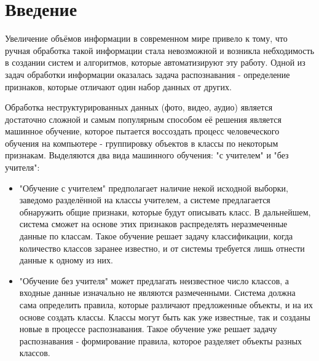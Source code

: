\documentclass[12pt,a4paper]{article}
\begin{document}
\section{Введение}
Увеличение объёмов информации в современном мире привело к тому, что ручная обработка такой информации стала невозможной и возникла небходимость в создании систем и алгоритмов, которые автоматизируют эту работу. Одной из задач обработки информации оказалась задача распознавания - определение признаков, которые отличают один набор данных от других.

Обработка неструктурированных данных (фото, видео, аудио) является достаточно сложной и самым популярным способом её решения является машинное обучение, которое пытается воссоздать процесс человеческого обучения на компьютере - группировку объектов в классы по некоторым признакам. Выделяются два вида машинного обучения: "с учителем" и "без учителя":
\begin{itemize}
    \item "Обучение с учителем" предполагает наличие некой исходной выборки, заведомо разделённой на классы учителем, а системе предлагается обнаружить общие признаки, которые будут описывать класс. В дальнейшем, система сможет на основе этих признаков распределять неразмеченные данные по классам. Такое обучение решает задачу классификации, когда количество классов заранее известно, и от системы требуется лишь отнести данные к одному из них.
    \item "Обучение без учителя" может предлагать неизвестное число классов, а входные данные изначально не являются размеченными. Система должна сама определить правила, которые различают предложенные объекты, и на их основе создать классы. Классы могут быть как уже известные, так и созданы новые в процессе распознавания. Такое обучение уже решает задачу распознавания - формирование правила, которое разделяет объекты разных классов.
\end{itemize}
\end{document}
